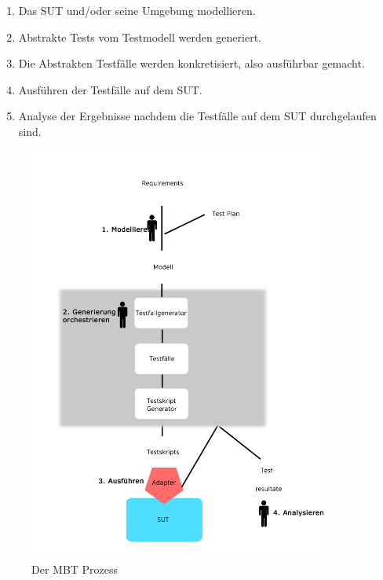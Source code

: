 \begin{enumerate}
\item Das \Gls{SUT} und/oder seine Umgebung modellieren.
\item Abstrakte Tests vom Testmodell werden generiert.
\item Die Abstrakten Testfälle werden konkretisiert, also ausführbar gemacht.
\item Ausführen der Testfälle auf dem SUT.
\item Analyse der Ergebnisse nachdem die Testfälle auf dem \Gls{SUT} durchgelaufen sind.
\end{enumerate}

\begin{figure}[h] 
  \centering
     \includegraphics[width=0.9\textwidth]{figures/MBT_Prozess.png}
  \caption{Der \Gls{MBT} Prozess \cite{utting_practical_2007}}
  \label{fig:mbt_prozess}
\end{figure}

